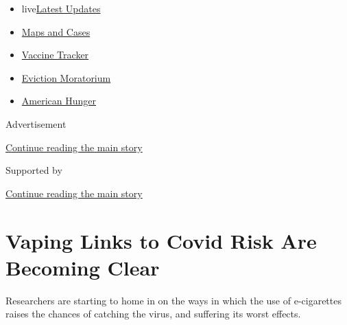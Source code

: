 \begin{itemize}
\tightlist
\item
  live\href{https://www.nytimes3xbfgragh.onion/2020/09/08/world/covid-19-coronavirus.html?name=styln-coronavirus-national\&region=TOP_BANNER\&block=storyline_menu_recirc\&action=click\&pgtype=Article\&impression_id=197cf001-f1be-11ea-82b8-c746ff1e5987\&variant=undefined}{Latest
  Updates}
\item
  \href{https://www.nytimes3xbfgragh.onion/interactive/2020/us/coronavirus-us-cases.html?name=styln-coronavirus-national\&region=TOP_BANNER\&block=storyline_menu_recirc\&action=click\&pgtype=Article\&impression_id=197cf002-f1be-11ea-82b8-c746ff1e5987\&variant=undefined}{Maps
  and Cases}
\item
  \href{https://www.nytimes3xbfgragh.onion/interactive/2020/science/coronavirus-vaccine-tracker.html?name=styln-coronavirus-national\&region=TOP_BANNER\&block=storyline_menu_recirc\&action=click\&pgtype=Article\&impression_id=197cf003-f1be-11ea-82b8-c746ff1e5987\&variant=undefined}{Vaccine
  Tracker}
\item
  \href{https://www.nytimes3xbfgragh.onion/2020/09/02/your-money/eviction-moratorium-covid.html?name=styln-coronavirus-national\&region=TOP_BANNER\&block=storyline_menu_recirc\&action=click\&pgtype=Article\&impression_id=197cf004-f1be-11ea-82b8-c746ff1e5987\&variant=undefined}{Eviction
  Moratorium}
\item
  \href{https://www.nytimes3xbfgragh.onion/interactive/2020/09/02/magazine/food-insecurity-hunger-us.html?name=styln-coronavirus-national\&region=TOP_BANNER\&block=storyline_menu_recirc\&action=click\&pgtype=Article\&impression_id=197cf005-f1be-11ea-82b8-c746ff1e5987\&variant=undefined}{American
  Hunger}
\end{itemize}

Advertisement

\protect\hyperlink{after-top}{Continue reading the main story}

Supported by

\protect\hyperlink{after-sponsor}{Continue reading the main story}

\hypertarget{vaping-links-to-covid-risk-are-becoming-clear}{%
\section{Vaping Links to Covid Risk Are Becoming
Clear}\label{vaping-links-to-covid-risk-are-becoming-clear}}

Researchers are starting to home in on the ways in which the use of
e-cigarettes raises the chances of catching the virus, and suffering its
worst effects.

